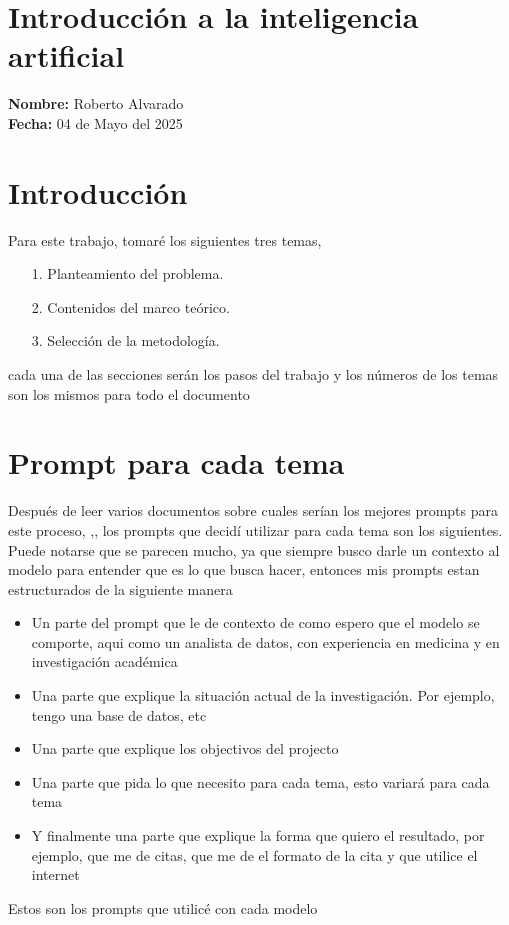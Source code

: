 \documentclass{article}
\begin{document}
\section*{\center Introducción a la inteligencia artificial}
\textbf{Nombre:} Roberto Alvarado\\
\textbf{Fecha:} 04 de Mayo del 2025
\section{Introducción}
Para este trabajo, tomaré los siguientes tres temas,

\begin{itemize}
    \item[1.] Planteamiento del problema.
    \item[2.] Contenidos del marco teórico.
    \item[3.] Selección de la metodología.
\end{itemize}
cada una de las secciones serán los pasos del trabajo y los números de los temas
son los mismos para todo el documento

\section{Prompt para cada tema}
Después de leer varios documentos sobre cuales serían los mejores prompts
para este proceso,
\cite{promptadvanceChatGPTPrompts},\cite{techpointBestChatGPT},
\cite{githubGitHubAhmetbersozchatgptpromptsforacademicwriting}
los prompts que decidí utilizar para cada tema son los
siguientes. Puede notarse que se parecen mucho, ya que
siempre busco darle un contexto al modelo para entender que
es lo que busca hacer, entonces mis prompts estan
estructurados de la siguiente manera
\begin{itemize}
    \item Un parte del prompt que le de contexto de como espero que el
        modelo se comporte, aqui como un analista de datos,
        con experiencia en medicina y en investigación
        académica

    \item Una parte que explique la situación actual de la
        investigación. Por ejemplo, tengo una base de datos,
        etc
    \item Una parte que explique los objectivos del projecto

    \item Una parte que pida lo que necesito para cada tema,
        esto variará para cada tema

    \item Y finalmente una parte que explique la forma que
        quiero el resultado, por ejemplo, que me de citas, que me de el
        formato de la cita y que utilice el internet
\end{itemize}
Estos son los prompts que utilicé con cada modelo
\end{document}
